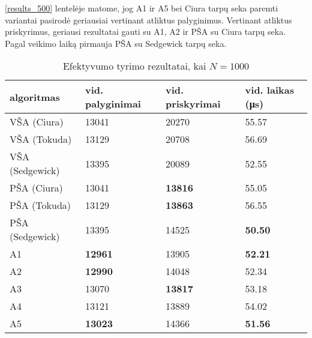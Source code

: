 \documentclass{VUMIFInfKursinis}
\begin{document}
\ref{results_500} lentelėje matome, jog
A1 ir A5 bei Ciura tarpų seka paremti variantai pasirodė geriausiai vertinant atliktus palyginimus.
Vertinant atliktus priskyrimus, geriausi rezultatai gauti su A1, A2 ir PŠA su Ciura tarpų seka.
Pagal veikimo laiką pirmauja PŠA su Sedgewick tarpų seka.

\begin{table}[H]
  \caption{Efektyvumo tyrimo rezultatai, kai $N = 1000$}
  \label{results_1000}
  \centering
  \begin{tabular}{@{}llll@{}}
  algoritmas & vid. palyginimai                       & vid. priskyrimai                       & vid. laikas (μs)                       \\ \midrule
  VŠA (Ciura)       & 13041                                  & 20270                                  & 55.57                                  \\
  VŠA (Tokuda)      & 13129                                  & 20708                                  & 56.69                                  \\
  VŠA (Sedgewick)       & 13395                                  & 20089                                  & 52.55                                  \\
  PŠA (Ciura)      & 13041                                  & \cellcolor[HTML]{70AD47}\textbf{13816} & 55.05                                  \\
  PŠA (Tokuda)      & 13129                                  & \cellcolor[HTML]{70AD47}\textbf{13863} & 56.55                                  \\
  PŠA (Sedgewick)      & 13395                                  & 14525                                  & \cellcolor[HTML]{70AD47}\textbf{50.50} \\
  A1      & \cellcolor[HTML]{70AD47}\textbf{12961} & 13905                                  & \cellcolor[HTML]{70AD47}\textbf{52.21} \\
  A2      & \cellcolor[HTML]{70AD47}\textbf{12990} & 14048                                  & 52.34                                  \\
  A3      & 13070                                  & \cellcolor[HTML]{70AD47}\textbf{13817} & 53.18                                  \\
  A4      & 13121                                  & 13889                                  & 54.02                                  \\
  A5      & \cellcolor[HTML]{70AD47}\textbf{13023} & 14366                                  & \cellcolor[HTML]{70AD47}\textbf{51.56} \\ \bottomrule
  \end{tabular}
\end{table}
\end{document}
